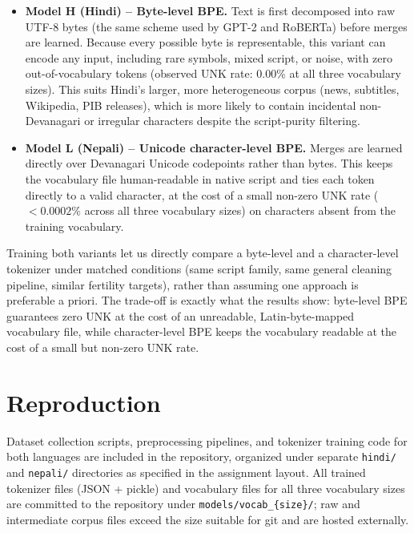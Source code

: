 \documentclass[11pt]{article}
\begin{document}
\begin{itemize}[nosep]
    \item \textbf{Model H (Hindi) -- Byte-level BPE.} Text is first decomposed into raw UTF-8 bytes (the same scheme used by GPT-2 and RoBERTa) before merges are learned. Because every possible byte is representable, this variant can encode any input, including rare symbols, mixed script, or noise, with zero out-of-vocabulary tokens (observed UNK rate: 0.00\% at all three vocabulary sizes). This suits Hindi's larger, more heterogeneous corpus (news, subtitles, Wikipedia, PIB releases), which is more likely to contain incidental non-Devanagari or irregular characters despite the script-purity filtering.
    \item \textbf{Model L (Nepali) -- Unicode character-level BPE.} Merges are learned directly over Devanagari Unicode codepoints rather than bytes. This keeps the vocabulary file human-readable in native script and ties each token directly to a valid character, at the cost of a small non-zero UNK rate ($< 0.0002\%$ across all three vocabulary sizes) on characters absent from the training vocabulary.
\end{itemize}

Training both variants let us directly compare a byte-level and a character-level tokenizer under matched conditions (same script family, same general cleaning pipeline, similar fertility targets), rather than assuming one approach is preferable a priori. The trade-off is exactly what the results show: byte-level BPE guarantees zero UNK at the cost of an unreadable, Latin-byte-mapped vocabulary file, while character-level BPE keeps the vocabulary readable at the cost of a small but non-zero UNK rate.

\section{Reproduction}

Dataset collection scripts, preprocessing pipelines, and tokenizer training code for both languages are included in the repository, organized under separate \texttt{hindi/} and \texttt{nepali/} directories as specified in the assignment layout. All trained tokenizer files (JSON + pickle) and vocabulary files for all three vocabulary sizes are committed to the repository under \texttt{models/vocab\_\{size\}/}; raw and intermediate corpus files exceed the size suitable for git and are hosted externally.
\end{document}
